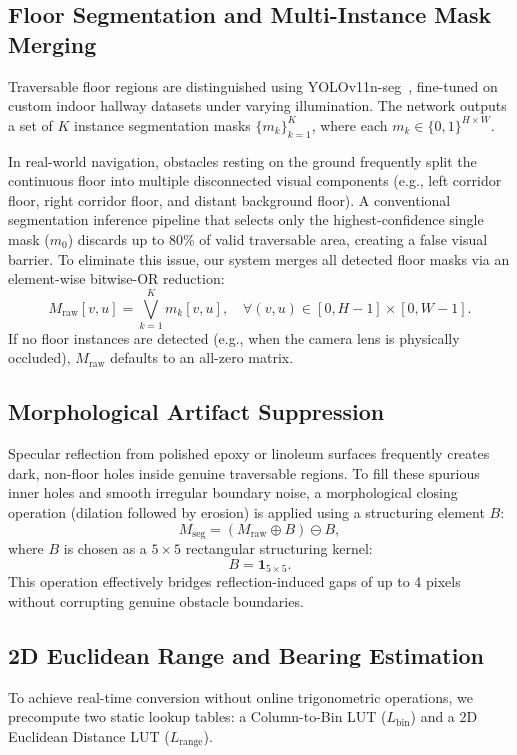 \documentclass{ieeeaccess}
\begin{document}
\subsection{Floor Segmentation and Multi-Instance Mask Merging}
\label{subsec:floor_seg}
Traversable floor regions are distinguished using YOLOv11n-seg~\cite{ultralytics_2024_ultralytics}, fine-tuned on custom indoor hallway datasets under varying illumination. The network outputs a set of $K$ instance segmentation masks $\{m_k\}_{k=1}^K$, where each $m_k \in \{0, 1\}^{H \times W}$.

In real-world navigation, obstacles resting on the ground frequently split the continuous floor into multiple disconnected visual components (e.g., left corridor floor, right corridor floor, and distant background floor). A conventional segmentation inference pipeline that selects only the highest-confidence single mask ($m_0$) discards up to 80\% of valid traversable area, creating a false visual barrier. To eliminate this issue, our system merges all detected floor masks via an element-wise bitwise-OR reduction:
\begin{equation}
  M_{\mathrm{raw}}[v, u] = \bigvee_{k=1}^K m_k[v, u], \quad \forall (v, u) \in [0, H-1] \times [0, W-1].
\end{equation}
If no floor instances are detected (e.g., when the camera lens is physically occluded), $M_{\mathrm{raw}}$ defaults to an all-zero matrix.

\subsection{Morphological Artifact Suppression}
Specular reflection from polished epoxy or linoleum surfaces frequently creates dark, non-floor holes inside genuine traversable regions. To fill these spurious inner holes and smooth irregular boundary noise, a morphological closing operation (dilation followed by erosion) is applied using a structuring element $B$:
\begin{equation}
  M_{\mathrm{seg}} = (M_{\mathrm{raw}} \oplus B) \ominus B,
\end{equation}
where $B$ is chosen as a $5 \times 5$ rectangular structuring kernel:
\begin{equation}
  B = \mathbf{1}_{5 \times 5}.
\end{equation}
This operation effectively bridges reflection-induced gaps of up to 4 pixels without corrupting genuine obstacle boundaries.

\subsection{2D Euclidean Range and Bearing Estimation}
\label{subsec:lut}
To achieve real-time conversion without online trigonometric operations, we precompute two static lookup tables: a Column-to-Bin LUT ($L_{\mathrm{bin}}$) and a 2D Euclidean Distance LUT ($L_{\mathrm{range}}$).
\end{document}
